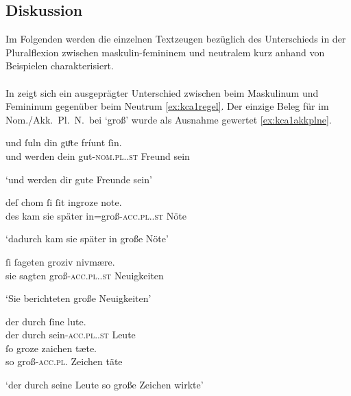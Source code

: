 \subsection{Diskussion}
\label{subsec:kc_adjflex_disc}

Im Folgenden werden die einzelnen Textzeugen bezüglich des Unterschieds in der
Plural\-flexion zwischen maskulin-femininem  und neutralem
 kurz anhand von Beispielen charakterisiert.

\paragraph{\citet{kc:A1}}
In \citet{kc:A1} zeigt sich ein ausgeprägter Unterschied zwischen
 beim Maskulinum und Femininum gegenüber  beim Neutrum
\cref{ex:kca1regel}. Der einzige Beleg für  im Nom./Akk.\ Pl.\ N.\ bei
 `groß' wurde als Ausnahme gewertet \cref{ex:kca1akkplne}.

\begin{exe}
\ex \label{ex:kca1regel}
	\begin{xlist}
	\ex \label{ex:kca1regel_1}
		\gll und ſuln din guͦte fríunt ſin. \\
			und werden dein gut-\textsc{nom.pl.\MascA.st} Freund sein \\
		\begin{taggedline}{\parencites[\pno~13\rb, 3]{kc:A1}[vgl.][3089]{schroeder1895}}
		\trans `und werden dir gute Freunde sein'
		\end{taggedline}

	\ex \label{ex:kca1regel_2}
		\gll deſ chom ſi ſit ingroze note. \\
			des kam sie später in=groß-\textsc{acc.pl.\FemI.st} Nöte \\
		\begin{taggedline}{\parencites[\pno~49\vb, 13]{kc:A1}[vgl.][11413]{schroeder1895}}
		\trans `dadurch kam sie später in große Nöte'
		\end{taggedline}

	\ex \label{ex:kca1regel_3}
		\gll ſi ſageten groziv nivmære. \\
			sie sagten groß-\textsc{acc.pl.\NeutI.st} Neuigkeiten \\
		\begin{taggedline}{\parencites[\pno~33\rb, 33]{kc:A1}[vgl.][7710]{schroeder1895}}
		\trans `Sie berichteten große Neuigkeiten'
		\end{taggedline}
	\end{xlist}

\ex\label{ex:kca1akkplne}
	\gll der durch ſine lute. \\
		der durch sein-\textsc{acc.pl.\MascA.st} Leute \\
\sn \gll ſo groze zaichen tæte. \\
		so groß-\textsc{acc.pl.\NeutI} Zeichen täte \\
	\begin{taggedline}{\parencites[\pno~45\rb, 10--11]{kc:A1}[vgl.][10331--10332]{schroeder1895}}
		\trans `der durch seine Leute so große Zeichen wirkte'
	\end{taggedline}
\end{exe}

